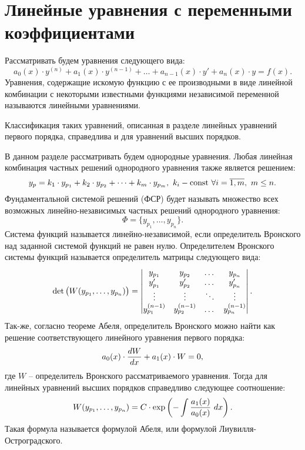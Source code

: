 \section{Линейные уравнения с переменными коэффициентами}

	Рассматривать будем уравнения следующего вида:
	\[ a_0(x) \cdot y^{(n)} + a_1(x) \cdot y^{(n-1)} + \dots + a_{n-1}(x) \cdot y' + a_n(x) \cdot y = f(x). \]
	Уравнения, содержащие искомую функцию с ее производными в виде линейной комбинации с некоторыми известными функциями независимой переменной называются линейными уравнениями.

    Классификация таких уравнений, описанная в разделе линейных уравнений первого порядка, справедлива и для уравнений высших порядков.

    В данном разделе рассматривать будем однородные уравнения. Любая линейная комбинация частных решений однородного уравнения также является решением:
    \[ y_p = k_1 \cdot y_{p_1} + k_2 \cdot y_{p_2} + \dots + k_m \cdot y_{p_m}, ~ k_i - \mathrm{const} ~ \forall i = \overline{1, m}, ~ m \leq n. \]
    Фундаментальной системой решений (ФСР) будет называть множество всех возможных линейно-независимых частных решений однородного уравнения:
    \[ \Phi = \{ y_{p_1}, \dots, y_{p_n} \}. \]
    Система функций называется линейно-независимой, если определитель Вронского над заданной системой функций не равен нулю. Определителем Вронского системы функций называется определитель матрицы следующего вида:
    \[ 
    	\det{ \bigl( W(y_{p_1}, \dots, y_{p_n}) \bigr) } =
        \begin{vmatrix}
            y_{p_1} & y_{p_2} & \dots & y_{p_n} \\
            y'_{p_1} & y'_{p_2} & \dots & y'_{p_n} \\
            \vdots & \vdots & \ddots & \vdots \\
            y^{(n - 1)}_{p_1} & y^{(n - 1)}_{p_2} & \dots & y^{(n - 1)}_{p_n} \\
        \end{vmatrix}.
    \]
    Так-же, согласно теореме Абеля, определитель Вронского можно найти как решение соответствующего линейного уравнения первого порядка:
    \[ a_0(x) \cdot \dfrac{d W}{d x} + a_1(x) \cdot W = 0, \]
	где $W$ -- определитель Вронского рассматриваемого уравнения. Тогда для линейных уравнений высших порядков справедливо следующее соотношение:
	\[ W(y_{p_1}, \dots, y_{p_n}) = C \cdot \exp\left( -\int \frac{a_1(x)}{a_0(x)} ~ dx \right). \]
	Такая формула называется формулой Абеля, или формулой Лиувилля-Остроградского.

